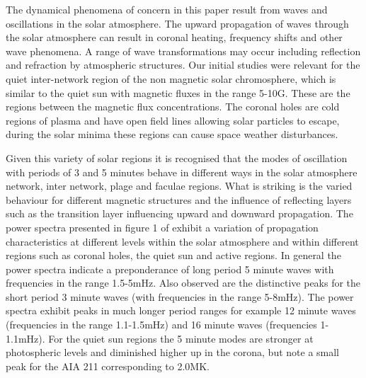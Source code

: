 \documentclass{aastex62}
\begin{document}
 
The dynamical phenomena of concern in this paper result from waves and oscillations in the solar atmosphere. The upward propagation of waves through the solar atmosphere can result in coronal heating, frequency shifts and other wave phenomena. A range of wave transformations may occur including reflection and refraction by atmospheric structures. Our initial studies were relevant for the quiet inter-network region of the non magnetic solar chromosphere, which is similar to the quiet sun with magnetic fluxes in the range 5-10G. These are the regions between the magnetic flux concentrations. The coronal holes are cold regions of plasma  and  have open field lines allowing solar particles to escape, during the solar minima these regions can cause space weather disturbances. 

 Given this variety of solar regions it is recognised that the modes of oscillation with periods of 3 and 5 minutes behave in different ways in the solar atmosphere network, inter network, plage and faculae regions. What is striking is the varied behaviour for different magnetic structures and the influence of reflecting layers such as the transition layer influencing upward and downward propagation.  The power spectra presented in figure 1 of \citet{Griffiths2018} exhibit a variation of propagation characteristics at different levels within the solar atmosphere and within different regions such as coronal holes, the quiet sun and active regions. In general the power spectra indicate a preponderance of long period 5 minute waves with frequencies in the range 1.5-5mHz. Also observed are the distinctive peaks for the short period 3 minute waves (with frequencies in the range 5-8mHz). The power spectra exhibit peaks in much longer period ranges for example 12 minute waves  (frequencies in the range 1.1-1.5mHz)  and 16 minute waves (frequencies 1-1.1mHz). For the quiet sun regions the 5 minute modes are stronger at photospheric levels and diminished higher up in the corona, but note a small peak for the AIA 211 corresponding to 2.0MK. 

\end{document}
